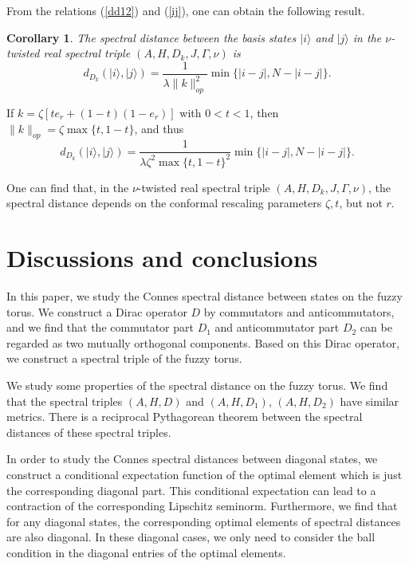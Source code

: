 \documentclass[a4paper,11pt]{article}
\newtheorem{corollary}{Corollary}
\begin{document}
From the relations (\ref{dd12}) and (\ref{ij}), one can obtain the following result.
\begin{corollary}
  The spectral distance between the basis states $|i \rangle$ and $|j \rangle$
  in the $\nu$-twisted real spectral triple $(A, H, D_k, J, \Gamma, \nu)$ is
  \begin{equation}
    d_{D_k}  (|i \rangle, |j \rangle) = \frac{1}{ \lambda
      \|k\|_{o p}^2} \min \{|i -j |, N - |i - j|\}.
  \end{equation}
\end{corollary}

If $k = \zeta [te_r + (1 - t) (1 - e_r)]$ with $0 < t < 1$, then $\|k\|_{o p} =
\zeta \max \{t, 1 - t\}$, and thus
\begin{equation}
  d_{D_k}  (|i \rangle, |j \rangle) = \frac{1}{ \lambda
    \zeta^2 \max \{t, 1 - t\}^2} \min \{|i -j |, N - |i - j|\}.
\end{equation}


One can find that, in the $\nu$-twisted real spectral
triple $(A, H, D_k, J, \Gamma, \nu)$, the spectral distance depends on the conformal rescaling parameters $\zeta,t$, but not $r$.


\section{Discussions and conclusions}\label{sec6}

In this paper, we study the Connes spectral distance between states on the fuzzy torus. We construct a Dirac operator $D$ by commutators and anticommutators, and we find that the commutator part $D_1$ and
anticommutator part $D_2$ can be regarded as two mutually orthogonal components. Based on this Dirac operator, we construct a spectral triple of the fuzzy torus.

We study some properties of the spectral distance on the fuzzy torus. We find that the spectral triples $(A, H, D)$ and $(A, H, D_1)$, $(A, H, D_2)$ have similar metrics. There is a reciprocal Pythagorean theorem between the spectral distances of these spectral triples.

In order to study the Connes spectral distances between diagonal states, we construct a conditional expectation function of the optimal element which is just the corresponding diagonal part. This conditional expectation can lead to a contraction of the corresponding Lipschitz seminorm. Furthermore, we find that for any diagonal states, the corresponding optimal elements of spectral distances are also diagonal. In these diagonal cases, we only need to consider the ball condition in the diagonal entries of the optimal elements.
\end{document}
